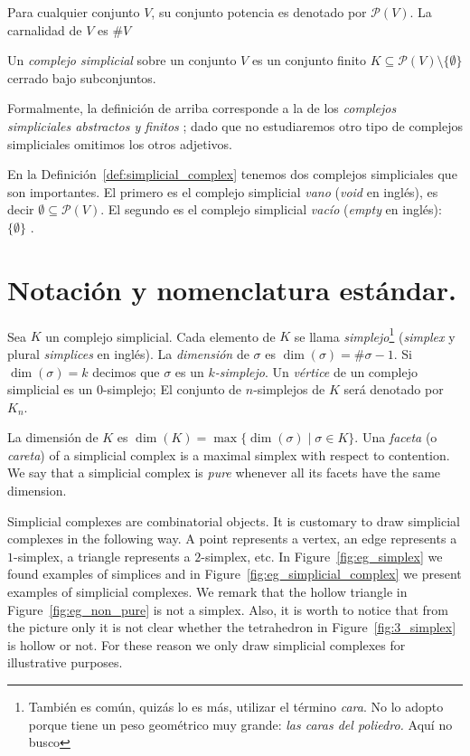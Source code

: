\documentclass{standalone}
\begin{document}
	\noindent Para cualquier conjunto $V$, su conjunto potencia es denotado por $\mathcal{P}(V)$. La carnalidad de $V$ es $\# V$
	
	\begin{definition}\label{def:simplicial_complex}
		Un \emph{complejo simplicial} sobre un conjunto $V$ es un conjunto finito $K\subseteq\mathcal{P}(V)\setminus\{\emptyset\}$ cerrado bajo subconjuntos.
	\end{definition}
	
	Formalmente, la definición de arriba corresponde a la de los \emph{complejos simpliciales abstractos y finitos} \cite[Definition 2.1]{kozlov:2008:combinatorial:alg:topo}; dado que no estudiaremos otro tipo de complejos simpliciales omitimos los otros adjetivos. 
	
	\begin{remark}\label{rem:empty_complexes}
		En la Definición~\ref{def:simplicial_complex} tenemos dos complejos simpliciales que son importantes. El primero es el complejo simplicial \emph{vano} (\emph{void} en inglés), es decir $\emptyset\subseteq\mathcal{P}(V)$. El segundo es el complejo simplicial \emph{vacío} (\emph{empty} en inglés): $\{\emptyset\}$ \cite[Remark 2.3]{kozlov:2008:combinatorial:alg:topo}. 
	\end{remark}
	
	\section{Notación y nomenclatura estándar.}
	\noindent Sea $K$ un complejo simplicial. Cada elemento de $K$ se llama \emph{simplejo}\footnote{También es común, quizás lo es más, utilizar el término \emph{cara}. No lo adopto porque tiene un peso geométrico muy grande: \textit{las caras del poliedro.} Aquí no busco } (\emph{simplex} y plural \emph{simplices} en inglés). La \emph{dimensión} de $\sigma$ es $\dim(\sigma)=\#\sigma-1$. Si $\dim(\sigma)=k$ decimos que $\sigma$ es un \emph{$k$-simplejo}. Un \emph{vértice} de un complejo simplicial es un $0$-simplejo; El conjunto de  $n$-simplejos de $K$ será denotado por $K_{n}$. 
	
	La dimensión de $K$ es $\dim(K)=\max\{\dim(\sigma)\mid\sigma\in K\}$. Una \emph{faceta} (o \emph{careta}) of a simplicial complex is a maximal simplex with respect to contention. We say that a simplicial complex is \emph{pure} whenever all its facets have the same dimension.
	
	Simplicial complexes are combinatorial objects. It is customary to draw simplicial complexes in the following way. A point represents a vertex, an edge represents a $1$-simplex, a triangle represents a $2$-simplex, etc. In Figure~\ref{fig:eg_simplex} we found examples of simplices and in Figure~\ref{fig:eg_simplicial_complex} we present examples of simplicial complexes. We remark that the hollow triangle in Figure~\ref{fig:eg_non_pure}  is not a simplex. Also, it is worth to notice that from the picture only it is not clear whether the tetrahedron in Figure~\ref{fig:3_simplex} is hollow or not. For these reason we only draw simplicial complexes for illustrative purposes.
\end{document}
